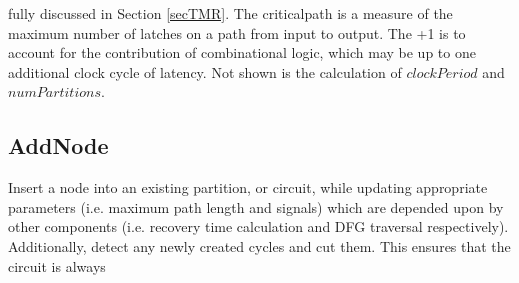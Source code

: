 \documentclass[12pt,final,oneside]{dwThesis} %
\begin{document}
   fully discussed in Section \ref{secTMR}. The criticalpath is a measure of
   the maximum number of latches on a path from input to output. The +1 is to
   account for the contribution of combinational logic, which may be up to one
   additional clock cycle of latency.  Not shown is the calculation of
   $clockPeriod$ and $numPartitions$.
   


   \newpage \subsection{AddNode} Insert a node into an existing partition, or
   circuit, while updating appropriate parameters (i.e. maximum path length and
   signals) which are depended upon by other components (i.e. recovery time
   calculation and \gls{DFG} traversal respectively).  Additionally, detect any
   newly created cycles and cut them.  This ensures that the circuit is always
\end{document}
